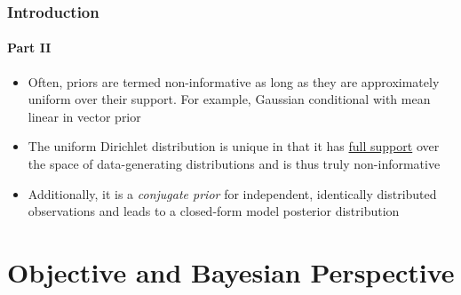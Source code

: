 \documentclass{beamer}
\begin{document}
\begin{frame}
\frametitle{Introduction}
\framesubtitle{Part II}

\begin{itemize}
\item Often, priors are termed non-informative as long as they are approximately uniform over their support. For example, Gaussian conditional with mean linear in vector prior
\vspace{0.5em}
\item The uniform Dirichlet distribution is unique in that it has \underline{full support} over the space of data-generating distributions and is thus truly non-informative
\vspace{0.5em}
\item Additionally, it is a \emph{conjugate prior} for independent, identically distributed observations and leads to a closed-form model posterior distribution

\end{itemize}

\end{frame}



\section{Objective and Bayesian Perspective}
\end{document}

